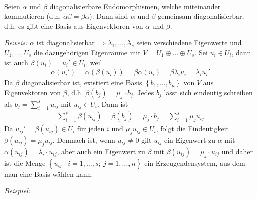 \begin{mysatz}\ \medskip

    Seien $\alpha$ und $\beta$ diagonalisierbare Endomorphismen, welche miteinander kommutieren (d.h. $\alpha\beta = \beta\alpha$).
    Dann sind $\alpha$ und $\beta$ gemeinsam diagonalisierbar, d.h. es gibt eine Basis aus Eigenvektoren von $\alpha$ und $\beta$.

    \textit{Beweis:}
    $\alpha$ ist diagonalisierbar $\Rightarrow \lambda_1,\ldots,\lambda_s$ seien verschiedene Eigenwerte und $U_1,\ldots,U_s$ die dazugehörigen Eigenräume mit $V = U_1 \oplus \ldots \oplus U_s$.
    Sei $u_i\in U_i$, dann ist auch $\beta(u_i)=u_i'\in U_i$, weil
    \begin{align*}
        \alpha(u_i')= \alpha(\beta(u_i)) = \beta\alpha(u_i) = \beta \lambda_i u_i = \lambda_i u_i'
    \end{align*}
    Da $\beta$ diagonalisierbar ist, existiert eine Basis $\left\{ b_1,\ldots,b_n \right\}$ von $V$ aus Eigenvektoren von $\beta$, d.h. $\beta(b_j)=\mu_j\cdot b_j$. Jedes $b_j$ lässt sich eindeutig schreiben als $b_j=\sum\limits_{i=1}^s u_{ij}$ mit $u_{ij}\in U_i.$ Dann ist
    \begin{align*}
        \sum_{i=1}^s \beta(u_{ij}) = \beta(b_j)=\mu_j\cdot b_j = \sum_{i=1}^s\mu_j u_{ij}
    \end{align*}
    Da $u_{ij}' = \beta(u_{ij}) \in U_i$ für jeden $i$ und $\mu_ju_{ij} \in U_i$, folgt die Eindeutigkeit $\beta(u_{ij}) = \mu_j u_{ij}$. Demnach ist, wenn $u_{ij}\neq0$ gilt $u_{ij}$ ein Eigenwert zu $\alpha$ mit $\alpha(u_{ij}) = \lambda_i \cdot u_{ij}$, aber auch ein Eigenwert zu $\beta$ mit $\beta(u_{ij})=\mu_j\cdot u_{ij}$ und daher ist die Menge $\left\{ u_{ij} \mid i = 1,\ldots,s;\ j = 1,\ldots,n \right\}$ ein Erzeugendensystem, aus dem man eine Basis wählen kann.
\end{mysatz}

\textit{Beispiel:}\medskip

